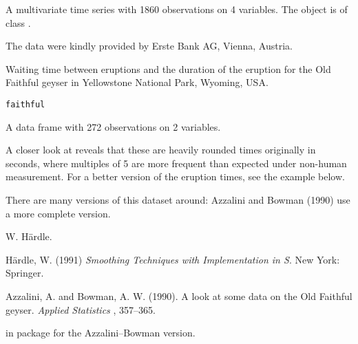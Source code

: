 %
\begin{Format}
A multivariate time series with 1860 observations on 4 variables.
The object is of class .
\end{Format}
%
\begin{Source}\relax
The data were kindly provided by Erste Bank AG, Vienna, Austria.
\end{Source}
%
\begin{Description}\relax
Waiting time between eruptions and the duration of the eruption for
the Old Faithful geyser in Yellowstone National Park, Wyoming, USA.
\end{Description}
%
\begin{Usage}
\begin{verbatim}
faithful
\end{verbatim}
\end{Usage}
%
\begin{Format}
A data frame with 272 observations on 2 variables.

\end{Format}
%
\begin{Details}\relax
A closer look at  reveals that these are
heavily rounded times originally in seconds, where multiples of 5 are
more frequent than expected under non-human measurement.  For a
better version of the eruption times, see the example below.

There are many versions of this dataset around: Azzalini and Bowman
(1990) use a more complete version.
\end{Details}
%
\begin{Source}\relax
W. Härdle.
\end{Source}
%
\begin{References}\relax
Härdle, W. (1991)
\emph{Smoothing Techniques with Implementation in S}.
New York: Springer.

Azzalini, A. and Bowman, A. W. (1990).
A look at some data on the Old Faithful geyser.
\emph{Applied Statistics} , 357--365.
\end{References}
%
\begin{SeeAlso}\relax
{} in package  for the Azzalini--Bowman version.
\end{SeeAlso}
